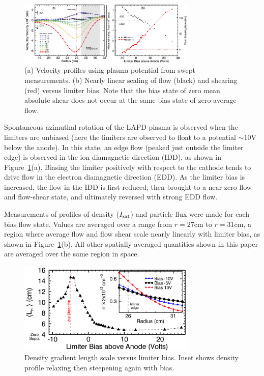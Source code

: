 \documentclass[aps,prl,amsmath,amssymb,preprint,superscriptaddress]{revtex4}
\begin{document}
\begin{figure}[!htbp]
\centerline{
\includegraphics[width=8.5cm]{velocity_flowshear}}
\caption{\label{fig:velocity_flowshear} (a) Velocity profiles using plasma potential from swept measurements. (b) Nearly linear scaling of flow (black) and shearing (red) versus limiter bias. Note that the bias state of zero mean absolute shear does not occur at the same bias state of zero average flow.}
\end{figure}

Spontaneous azimuthal rotation of the LAPD plasma is observed when the limiters are
unbiased (here the limiters are observed to float to a
potential $\sim 10$V below the anode).  In this state, an edge flow
(peaked just outside the limiter edge) is
observed in the ion diamagnetic direction (IDD), as shown in
Figure~\ref{fig:velocity_flowshear}(a).  Biasing the limiter positively
with respect to the cathode tends to drive flow in the electron
diamagnetic direction (EDD).  As the limiter bias is increased, the
flow in the IDD is first reduced, then brought to a near-zero flow
and flow-shear state, and ultimately reversed with strong EDD flow.

Measurements of profiles of density ($I_{\rm sat}$) and particle flux
were made for each bias flow state. Values are averaged over a range
from $r=27$cm to $r=31$cm, a region where average flow and flow shear scale
nearly linearly with limiter bias, as shown in
Figure~\ref{fig:velocity_flowshear}(b).  All other spatially-averaged
quantities shown in this paper are averaged over the same region in space.

\begin{figure}[!htbp]
\centerline{
\includegraphics[width=8.5cm]{densgrad}}
\caption{\label{fig:densgrad} Density gradient length scale versus limiter bias. Inset shows density profile relaxing then steepening again with bias.}
\end{figure}
\end{document}
